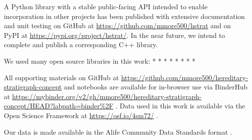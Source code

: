 A Python library with a stable public-facing API intended to enable incorporation in other projects has been published with extensive documentation and unit testing on GitHub at \url{https://github.com/mmore500/hstrat} and on PyPI at \url{https://pypi.org/project/hstrat/}.
In the near future, we intend to complete and publish a corresponding C++ library.

We used many open source libraries in this work:
* \citep{sukumaran2010dendropy}
* \citep{cock2009biopython}
* \citep{virtanen2020scipy}
* \citep{hunter2007matplotlib}
* \citep{virtanen2020scipy}
* \citep{waskom2021seaborn}
* \citep{bostock2011d3}
* \citep{lalejini2019data}

All supporting materials on GitHub at \url{https://github.com/mmore500/hereditary-stratigraph-concept} and notebooks are available for in-browser use via BinderHub at \url{https://mybinder.org/v2/gh/mmore500/hereditary-stratigraph-concept/HEAD?labpath=binder%2F} \citep{ragan2018binder}.
Data used in this work is available via the Open Science Framework at
\url{https://osf.io/4sm72/} \citep{moreno2022hstratconceptsupplement} \citep{foster2017open}.

Our data is made available in the Alife Community Data Standards format \citep{lalejini2019data}.






